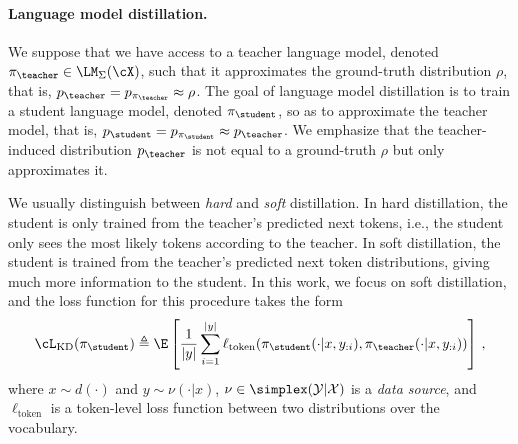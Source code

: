 
\paragraph{Language model distillation.}

We suppose that we have access to a teacher language model,
denoted $\pi_{\teacher} \in \LM_\Sigma(\cX)$, such that it approximates the ground-truth distribution $\rho$, that is, $p_{\teacher} = p_{\pi_{\teacher}} \approx \rho$. The goal of language model distillation is to train a student language model, denoted $\pi_{\student}$, so as to approximate the teacher model, that is, $p_{\student} = p_{\pi_{\student}} \approx p_{\teacher}$. We emphasize that the teacher-induced distribution $p_{\teacher}$ is not equal to a ground-truth $\rho$ but only approximates it. 

We usually distinguish between \textit{hard} and \textit{soft} distillation. In hard distillation, the student is only trained from the teacher's predicted next tokens, i.e., the student only sees the most likely tokens according to the teacher. In soft distillation, the student is trained from the teacher's predicted next token distributions, giving much more information to the student. In this work, we focus on soft distillation, and the loss function for this procedure takes the form
\begin{equation}\label{eq:distillation_loss}
    \cL_{\mathrm{KD}}(\pi_{\student}) \triangleq \E\left[ \frac{1}{|y|} \sum_{i=1}^{|y|} \ell_{\mathrm{token}}(\pi_{\student}(\cdot | x, y_{:i}), \pi_{\teacher}(\cdot | x, y_{:i})) \right]\,,
\end{equation}
where $x \sim d(\cdot)$ and $y \sim \nu(\cdot| x)$, \(\nu \in \simplex(\mathcal{Y} | \mathcal{X})\) is a \textit{data source}, and \(\ell_{\mathrm{token}}\) is a token-level loss function between two distributions over the vocabulary.

